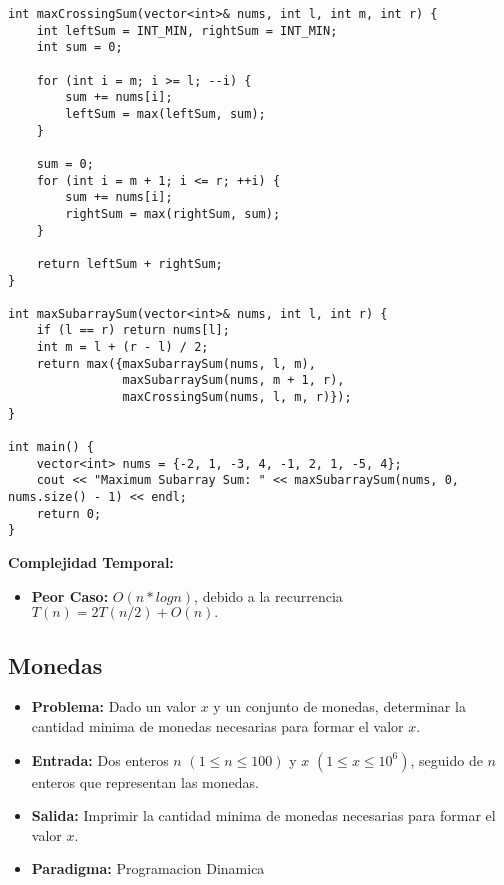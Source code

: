         \begin{lstlisting}[style=cpp]
int maxCrossingSum(vector<int>& nums, int l, int m, int r) {
    int leftSum = INT_MIN, rightSum = INT_MIN;
    int sum = 0;

    for (int i = m; i >= l; --i) {
        sum += nums[i];
        leftSum = max(leftSum, sum);
    }

    sum = 0;
    for (int i = m + 1; i <= r; ++i) {
        sum += nums[i];
        rightSum = max(rightSum, sum);
    }

    return leftSum + rightSum;
}

int maxSubarraySum(vector<int>& nums, int l, int r) {
    if (l == r) return nums[l];
    int m = l + (r - l) / 2;
    return max({maxSubarraySum(nums, l, m),
                maxSubarraySum(nums, m + 1, r),
                maxCrossingSum(nums, l, m, r)});
}

int main() {
    vector<int> nums = {-2, 1, -3, 4, -1, 2, 1, -5, 4};
    cout << "Maximum Subarray Sum: " << maxSubarraySum(nums, 0, nums.size() - 1) << endl;
    return 0;
}
    \end{lstlisting}
    \textbf{Complejidad Temporal: }
    \begin{itemize}
        \item \textbf{Peor Caso: }$O(n *logn)$, debido a la recurrencia $T(n) = 2T(n/2) + O(n).$

    \end{itemize}

\newpage
\subsection{Monedas}

\begin{itemize}
  \item \textbf{Problema: }Dado un valor $x$ y un conjunto de monedas, determinar la cantidad minima de monedas necesarias para formar el valor $x$. 
  \item \textbf{Entrada: }Dos enteros $n$ $(1 \leq n \leq 100)$ y $x$ $(1 \leq x \leq 10^6)$, seguido de $n$ enteros que representan las monedas. 
  \item \textbf{Salida: }Imprimir la cantidad minima de monedas necesarias para formar el valor $x$. 

  \item \textbf{Paradigma: } Programacion Dinamica
\end{itemize}

